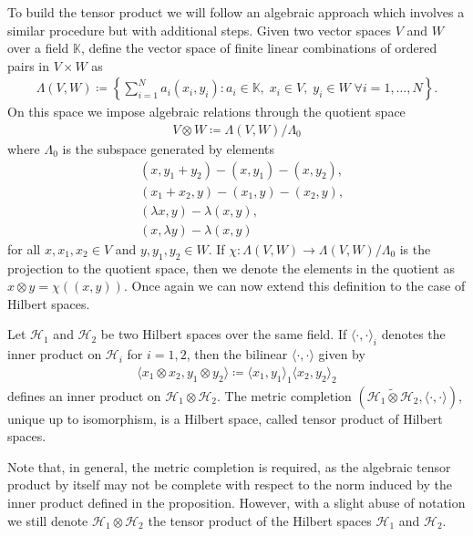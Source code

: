 \begin{appendices}
To build the tensor product we will follow an algebraic approach which involves a similar
procedure but with additional steps. Given two vector spaces $V$ and $W$ over a field $\mathbb{K}$,
define the vector space of finite linear combinations of ordered pairs in $V\times W$ as
\begin{align*}
	\Lambda(V,W) \coloneq \left\{ \sum_{i=1}^N a_i (x_i,y_i) : a_i\in\mathbb{K},\;
	x_i\in V,\;y_i\in W\;\forall i=1,\ldots,N\right\}.
\end{align*}
On this space we impose algebraic relations through the quotient space
\begin{align*}
	V\otimes W \coloneq \Lambda(V,W)/\Lambda_0
\end{align*}
where $\Lambda_0$ is the subspace generated by elements
\begin{align*}
		&(x,y_1+y_2)-(x,y_1)-(x,y_2),\\
		&(x_1+x_2,y)-(x_1,y)-(x_2,y),\\
		&(\lambda x,y)-\lambda(x,y),\\
		&(x,\lambda y)-\lambda(x,y)
\end{align*}
for all $x,x_1,x_2\in V$ and $y,y_1,y_2\in W$. If $\chi:\Lambda(V,W) \to \Lambda(V,W)/\Lambda_0$
is the projection to the quotient space, then we denote the elements in the quotient as
$x\otimes y=\chi((x,y))$. Once again we can now extend this definition to the case of Hilbert
spaces.

\begin{proposition}
	\label{tensor-product}
	Let $\mathcal{H}_1$ and $\mathcal{H}_2$ be two Hilbert spaces over the same field. If
	$\langle\cdot,\cdot\rangle_i$ denotes the inner product on $\mathcal{H}_i$ for $i=1,2$,
	then the bilinear $\langle\cdot,\cdot\rangle$ given by
	\begin{align*}
		\langle x_1\otimes x_2, y_1\otimes y_2\rangle \coloneq \langle x_1,y_1\rangle_1 \langle x_2,y_2\rangle_2
	\end{align*}
	defines an inner product on $\mathcal{H}_1\otimes\mathcal{H}_2$. The 
	metric completion $(\mathcal{H}_1\tilde\otimes\mathcal{H}_2,\langle\cdot,\cdot\rangle)$,
	unique up to isomorphism, is a Hilbert space, called tensor product of Hilbert spaces.
\end{proposition}

\begin{remark}
	Note that, in general, the metric completion is required, as the algebraic tensor product
	by itself may not be complete with respect to the norm induced by the inner product defined
	in the proposition. However, with a slight abuse of notation we still denote
	$\mathcal{H}_1\otimes\mathcal{H}_2$ the tensor product of the Hilbert spaces
	$\mathcal{H}_1$ and $\mathcal{H}_2$.
\end{remark}


\end{appendices}
